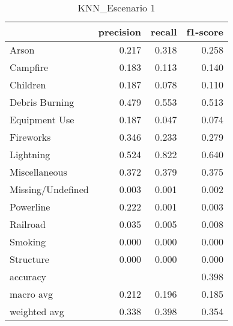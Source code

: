 \begin{table}
\centering
\caption{KNN_Escenario 1}
\label{tab:Reporte de clasificación para el Escenario 1 utilizando KNN}
\begin{tabular}{lrrr}
\toprule
{} &  precision &  recall &  f1-score \\
\midrule
Arson             &      0.217 &   0.318 &     0.258 \\
Campfire          &      0.183 &   0.113 &     0.140 \\
Children          &      0.187 &   0.078 &     0.110 \\
Debris Burning    &      0.479 &   0.553 &     0.513 \\
Equipment Use     &      0.187 &   0.047 &     0.074 \\
Fireworks         &      0.346 &   0.233 &     0.279 \\
Lightning         &      0.524 &   0.822 &     0.640 \\
Miscellaneous     &      0.372 &   0.379 &     0.375 \\
Missing/Undefined &      0.003 &   0.001 &     0.002 \\
Powerline         &      0.222 &   0.001 &     0.003 \\
Railroad          &      0.035 &   0.005 &     0.008 \\
Smoking           &      0.000 &   0.000 &     0.000 \\
Structure         &      0.000 &   0.000 &     0.000 \\
accuracy          &            &         &     0.398 \\
macro avg         &      0.212 &   0.196 &     0.185 \\
weighted avg      &      0.338 &   0.398 &     0.354 \\
\bottomrule
\end{tabular}
\end{table}
